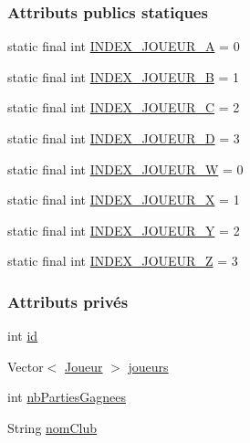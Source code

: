 \subsubsection*{Attributs publics statiques}
\begin{DoxyCompactItemize}
\item 
static final int \hyperlink{classcom_1_1example_1_1area_1_1_equipe_a3b61c78bfb4284470bc3b5315b6b03e7}{I\+N\+D\+E\+X\+\_\+\+J\+O\+U\+E\+U\+R\+\_\+A} = 0
\item 
static final int \hyperlink{classcom_1_1example_1_1area_1_1_equipe_a1b9c3f1c23757be40472c63504df9d37}{I\+N\+D\+E\+X\+\_\+\+J\+O\+U\+E\+U\+R\+\_\+B} = 1
\item 
static final int \hyperlink{classcom_1_1example_1_1area_1_1_equipe_abbd44b4789c0234d86578fbbfd8bf624}{I\+N\+D\+E\+X\+\_\+\+J\+O\+U\+E\+U\+R\+\_\+C} = 2
\item 
static final int \hyperlink{classcom_1_1example_1_1area_1_1_equipe_ae204f48df7446d745f33ff4a7e662ea7}{I\+N\+D\+E\+X\+\_\+\+J\+O\+U\+E\+U\+R\+\_\+D} = 3
\item 
static final int \hyperlink{classcom_1_1example_1_1area_1_1_equipe_aeca3d6f47e05b7c2aef70b64778d5d47}{I\+N\+D\+E\+X\+\_\+\+J\+O\+U\+E\+U\+R\+\_\+W} = 0
\item 
static final int \hyperlink{classcom_1_1example_1_1area_1_1_equipe_ae5f0313dce371f13950d4fdc54074dd9}{I\+N\+D\+E\+X\+\_\+\+J\+O\+U\+E\+U\+R\+\_\+X} = 1
\item 
static final int \hyperlink{classcom_1_1example_1_1area_1_1_equipe_a11d252140fc4e3edd71a31573221a7b7}{I\+N\+D\+E\+X\+\_\+\+J\+O\+U\+E\+U\+R\+\_\+Y} = 2
\item 
static final int \hyperlink{classcom_1_1example_1_1area_1_1_equipe_a50e1c2cbd7d24c8c5b4f0f4de1652621}{I\+N\+D\+E\+X\+\_\+\+J\+O\+U\+E\+U\+R\+\_\+Z} = 3
\end{DoxyCompactItemize}
\subsubsection*{Attributs privés}
\begin{DoxyCompactItemize}
\item 
int \hyperlink{classcom_1_1example_1_1area_1_1_equipe_a3be17f443cb57269d595d8b860acc66a}{id}
\item 
Vector$<$ \hyperlink{classcom_1_1example_1_1area_1_1_joueur}{Joueur} $>$ \hyperlink{classcom_1_1example_1_1area_1_1_equipe_a13f5e9288dec5f11829e1a7ccc21cdc9}{joueurs}
\item 
int \hyperlink{classcom_1_1example_1_1area_1_1_equipe_af01e154be3aaa3fbcf909c3a44734b2e}{nb\+Parties\+Gagnees}
\item 
String \hyperlink{classcom_1_1example_1_1area_1_1_equipe_ac93205e041df88192dd6b1dfc8488e0a}{nom\+Club}
\end{DoxyCompactItemize}


